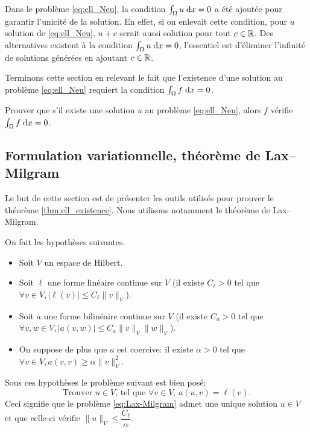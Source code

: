 \documentclass[12pt,a4paper,twoside]{article}
\begin{document}
Dans le probl\`eme \eqref{eq:ell_Neu}, 
la condition $\int_{\Omega} u \;\mathrm{d} x = 0$ a \'et\'e ajout\'ee
pour garantir l'unicit\'e de la solution. 
En effet, si on enlevait cette condition, pour $u$ solution
de \eqref{eq:ell_Neu}, $u+c$ serait aussi solution pour tout $c\in \mathbb{R}$.
Des alternatives existent \`a la condition 
$\int_{\Omega} u \;\mathrm{d} x = 0$,
l'essentiel est d'\'eliminer l'infinit\'e de solutions g\'en\'er\'ees en
ajoutant $c\in\mathbb{R}$.

Terminons cette section en relevant le fait que l'existence d'une solution
au probl\`eme \eqref{eq:ell_Neu} requiert la condition
$\int_{\Omega} f \;\mathrm{d} x = 0$.

\begin{exercise}
  Prouver que s'il existe une solution $u$ au probl\`eme \eqref{eq:ell_Neu},
  alors $f$ v\'erifie $\int_{\Omega} f \;\mathrm{d} x = 0$.
\end{exercise}

\subsection{Formulation variationnelle, th\'eor\`eme de Lax--Milgram}
\label{subsec:LM}

Le but de cette section est de pr\'esenter les outils utilis\'es pour prouver 
le th\'eor\`eme \ref{thm:ell_existence}.
Nous utilisons notamment le th\'eor\`eme de Lax--Milgram.

\begin{theorem}
  \label{thm:Lax-Milgram}
  On fait les hypoth\`eses suivantes.
  \begin{itemize}
  \item Soit $V$ un espace de Hilbert.
  \item Soit $\ell$ une forme lin\'eaire continue sur $V$
    (il existe $C_{\ell} > 0$ tel que $\forall v \in V, |\ell(v)| \leq C_{\ell} \| v \|_{V}$).
  \item Soit $a$ une forme bilin\'eaire continue sur $V$
    (il existe $C_{a} > 0$ tel que $\forall v,w \in V, |a(v,w)| \leq C_{a} \| v \|_{V} \| w \|_{V}$).
  \item On suppose de plus que $a$ est coercive:
    il existe $\alpha > 0$ tel que $\forall v \in V, a(v,v) \geq \alpha \| v \|_{V}^2$.
  \end{itemize}
  Sous ces hypoth\`eses le probl\`eme suivant est bien pos\'e:
  \begin{equation}
    \label{eq:Lax-Milgram}
    \text{Trouver $u \in V$, tel que $\forall v \in V$, } a(u,v) = \ell(v) .
  \end{equation}
  Ceci signifie que le probl\`eme \eqref{eq:Lax-Milgram} admet une unique solution $u \in V$
  et que celle-ci v\'erifie $\| u \|_{V} \leq \dfrac{C_{\ell}}{\alpha}$.
\end{theorem}
\end{document}
